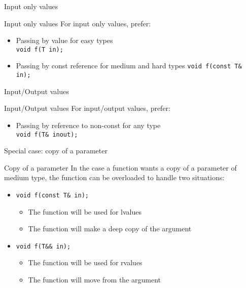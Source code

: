 \begin{frame}{Input only values}{}
  \begin{block}{Input only values}
    For input only values, prefer:
    \begin{itemize}
    \item
      Passing by value for easy types \\
      \lstinline!void f(T in);!
    \item
      Passing by const reference for medium and hard types
      \lstinline!void f(const T& in);!
    \end{itemize}
  \end{block}

  \begin{example}
  \end{example}
\end{frame}

\begin{frame}{Input/Output values}{}
  \begin{block}{Input/Output values}
    For input/output values, prefer:
    \begin{itemize}
    \item
      Passing by reference to non-const for any type \\
      \lstinline!void f(T& inout);!
    \end{itemize}
  \end{block}

  \begin{example}
  \end{example}
\end{frame}


\begin{frame}{Special case: copy of a parameter}{}
  \begin{block}{Copy of a parameter}
    In the case a function wants a copy of a parameter of medium type, the function can be overloaded to handle two situations:
    \begin{itemize}
    \item
      \lstinline!void f(const T& in);!
      \begin{itemize}
      \item
        The function will be used for lvalues
      \item
        The function will make a deep copy of the argument
      \end{itemize}
    \item
      \lstinline!void f(T&& in);!
      \begin{itemize}
      \item
        The function will be used for rvalues
      \item
        The function will move from the argument
      \end{itemize}
    \end{itemize}
  \end{block}
\end{frame}



